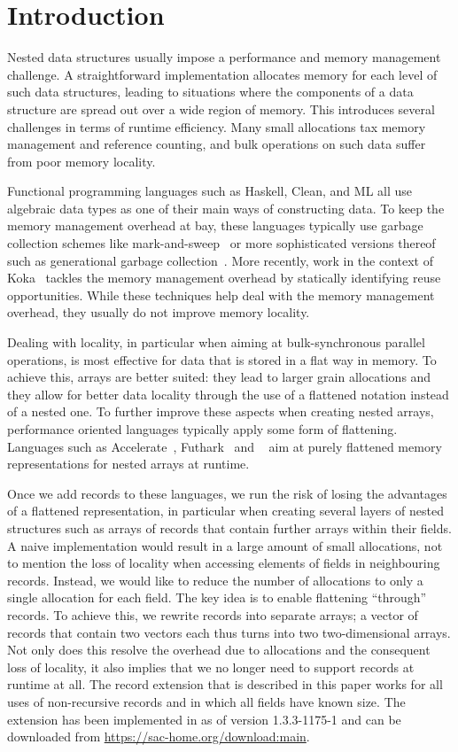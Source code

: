 
\section{Introduction}

Nested data structures usually impose a performance and memory management challenge.
A straightforward implementation allocates memory for each level of such data structures, leading to situations where the components of a data structure are spread out over a wide region of memory.
This introduces several challenges in terms of runtime efficiency.
Many small allocations tax memory management and reference counting, and bulk operations on such data suffer from poor memory locality.

Functional programming languages such as Haskell, Clean, and ML all use algebraic data types as one of their main ways of constructing data.
To keep the memory management overhead at bay, these languages typically use garbage collection schemes like mark-and-sweep~\cite{mark-and-sweep} or more sophisticated versions thereof such as generational garbage collection~\cite{generational-gc}.
More recently, work in the context of Koka~\cite{koka,kokamem} tackles the memory management overhead by statically identifying reuse opportunities.
While these techniques help deal with the memory management overhead, they usually do not improve memory locality.

Dealing with locality, in particular when aiming at bulk-synchronous parallel operations, is most effective for data that is stored in a flat way in memory.
To achieve this, arrays are better suited: they lead to larger grain allocations and they allow for better data locality through the use of a flattened notation instead of a nested one.
To further improve these aspects when creating nested arrays, performance oriented languages typically apply some form of flattening.
Languages such as Accelerate~\cite{accelerate}, Futhark~\cite{futhark} and \sac{}~\cite{sac,sac2} aim at purely flattened memory representations for nested arrays at runtime.

Once we add records to these languages, we run the risk of losing the advantages of a flattened representation, in particular when creating several layers of nested structures such as arrays of records that contain further 
arrays within their fields.
A naive implementation would result in a large amount of small allocations, not to mention the loss of locality when accessing elements of fields in neighbouring records.
Instead, we would like to reduce the number of allocations to only a single allocation for each field.
The key idea is to enable flattening ``through'' records.
To achieve this, we rewrite records into separate arrays; a vector of records that contain two vectors each thus turns into two two-dimensional arrays.
Not only does this resolve the overhead due to allocations and the consequent loss of locality, it also implies that we no longer need to support records at runtime at all.
The record extension that is described in this paper works for all uses of non-recursive records and in which all fields have known size.
The extension has been implemented in \sac{} as of version 1.3.3-1175-1 and can be downloaded from \url{https://sac-home.org/download:main}.

